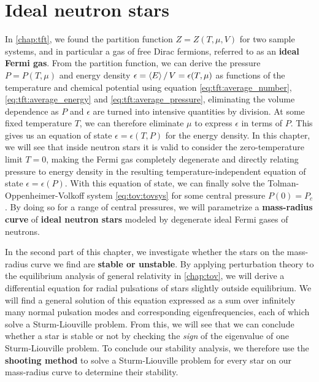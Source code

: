 \chapter{Ideal neutron stars}
\label{chap:nstars}

In \cref{chap:tft}, we found the partition function $Z = Z(T, \mu, V)$ for two sample systems, and in particular a gas of free Dirac fermions, referred to as an \textbf{ideal Fermi gas}.
From the partition function, we can derive the pressure $P = P(T, \mu)$ and energy density $\epsilon = \left\langle E \right\rangle / \, V = \epsilon(T, \mu)$ as functions of the temperature and chemical potential using equation \eqref{eq:tft:average_number}, \eqref{eq:tft:average_energy} and \eqref{eq:tft:average_pressure}, eliminating the volume dependence as $P$ and $\epsilon$ are turned into intensive quantities by division.
At some fixed temperature $T$, we can therefore eliminate $\mu$ to express $\epsilon$ in terms of $P$.
This gives us an equation of state $\epsilon = \epsilon(T, P)$ for the energy density.
In this chapter, we will see that inside neutron stars it is valid to consider the zero-temperature limit $T=0$, making the Fermi gas completely degenerate and directly relating pressure to energy density in the resulting temperature-independent equation of state $\epsilon = \epsilon(P)$.
With this equation of state, we can finally solve the Tolman-Oppenheimer-Volkoff system \eqref{eq:tov:tovsys} for some central pressure $P(0)=P_c$.
By doing so for a range of central pressures, we will parametrize a \textbf{mass-radius curve} of \textbf{ideal neutron stars} modeled by degenerate ideal Fermi gases of neutrons.

In the second part of this chapter, we investigate whether the stars on the mass-radius curve we find are \textbf{stable or unstable}.
By applying perturbation theory to the equilibrium analysis of general relativity in \cref{chap:tov}, we will derive a differential equation for radial pulsations of stars slightly outside equilibrium.
We will find a general solution of this equation expressed as a sum over infinitely many normal pulsation modes and corresponding eigenfrequencies, each of which solve a Sturm-Liouville problem.
From this, we will see that we can conclude whether a star is stable or not by checking the \emph{sign} of the eigenvalue of one Sturm-Liouville problem.
To conclude our stability analysis, we therefore use the \textbf{shooting method} to solve a Sturm-Liouville problem for every star on our mass-radius curve to determine their stability.

